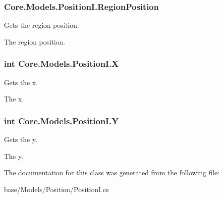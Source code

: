 \subsubsection[{Region\+Position}]{ Core.\+Models.\+Position\+I.\+Region\+Position\hspace{0.3cm}{\ttfamily [get]}}\label{classCore_1_1Models_1_1PositionI_a0662e0b43f175a5320f043298984659b}


Gets the region position. 

The region position.\hypertarget{classCore_1_1Models_1_1PositionI_a2612b865ceba85b37714a5d19a0228c5}{}
\subsubsection[{X}]{\setlength{\rightskip}{0pt plus 5cm}int Core.\+Models.\+Position\+I.\+X\hspace{0.3cm}{\ttfamily [get]}}\label{classCore_1_1Models_1_1PositionI_a2612b865ceba85b37714a5d19a0228c5}


Gets the x. 

The x.\hypertarget{classCore_1_1Models_1_1PositionI_ae8a742f3f984a83b3fc7706a2c9ed254}{}
\subsubsection[{Y}]{\setlength{\rightskip}{0pt plus 5cm}int Core.\+Models.\+Position\+I.\+Y\hspace{0.3cm}{\ttfamily [get]}}\label{classCore_1_1Models_1_1PositionI_ae8a742f3f984a83b3fc7706a2c9ed254}


Gets the y. 

The y.

The documentation for this class was generated from the following file\+:\begin{DoxyCompactItemize}
\item 
base/\+Models/\+Position/Position\+I.\+cs\end{DoxyCompactItemize}
